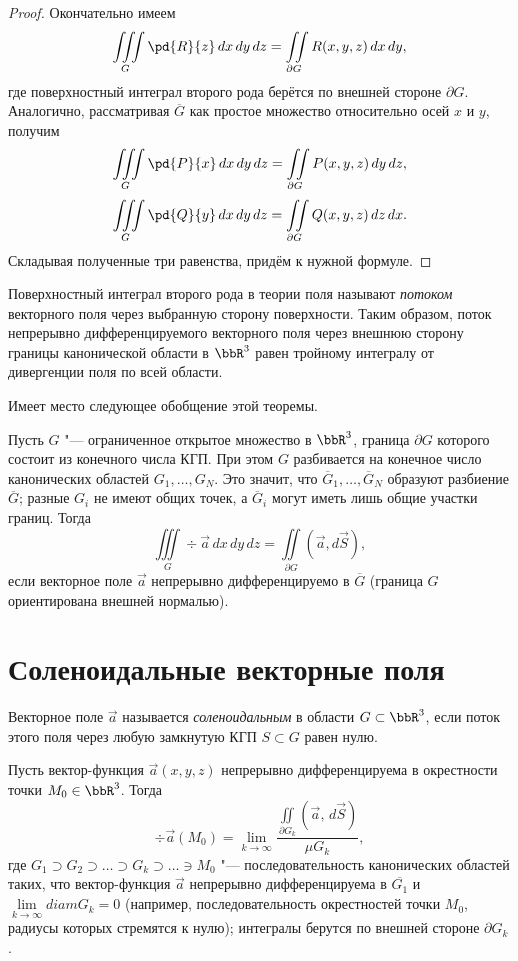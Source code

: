 \begin{proof}
Окончательно имеем
$$
\iiint\limits_G \pd{R}{z}\,dx\,dy\,dz = \iint\limits_{\partial G} R(x, y, z)\,dx\,dy,
$$
где поверхностный интеграл второго рода берётся по внешней стороне $\partial G$. Аналогично, рассматривая $\overline{G}$ как простое множество относительно осей $x$ и $y$, получим
$$
\iiint\limits_G \pd{P}{x}\,dx\,dy\,dz = \iint\limits_{\partial G} P(x, y, z)\,dy\,dz,
$$
$$
\iiint\limits_G \pd{Q}{y}\,dx\,dy\,dz = \iint\limits_{\partial G} Q(x, y, z)\,dz\,dx.
$$
Складывая полученные три равенства, придём к нужной формуле.
\end{proof}

Поверхностный интеграл второго рода в теории поля называют \textit{потоком} векторного поля через выбранную сторону поверхности. Таким образом, поток непрерывно дифференцируемого векторного поля через внешнюю сторону границы канонической области в $\bbR^3$ равен тройному интегралу от дивергенции поля по всей области.

Имеет место следующее обобщение этой теоремы.

\begin{thm}
Пусть $G$ "--- ограниченное открытое множество в $\bbR^3$, граница $\partial G$ которого состоит из конечного числа КГП. При этом $G$ разбивается на конечное число канонических областей $G_1, \ldots, G_N$. Это значит, что $\overline{G}_1, \ldots, \overline{G}_N$ образуют разбиение $\overline{G}$; разные $G_i$ не имеют общих точек, а $\overline{G}_i$ могут иметь лишь общие участки границ. Тогда
$$
\iiint\limits_G \div \vec{a}\,dx\,dy\,dz = \iint\limits_{\partial G} (\vec{a}, d\vec{S}),
$$
если векторное поле $\vec{a}$ непрерывно дифференцируемо в $\overline{G}$ (граница $G$ ориентирована внешней нормалью).
\end{thm}


\section{Соленоидальные векторные поля}

\begin{defn}
Векторное поле $\vec{a}$ называется \textit{соленоидальным} в области $G \subset \bbR^3$, если поток этого поля через любую замкнутую КГП $S \subset G$ равен нулю.
\end{defn}

\begin{thm} \label{th21:2}
Пусть вектор-функция $\vec{a}(x, y, z)$ непрерывно дифференцируема в окрестности точки $M_0 \in \bbR^3$. Тогда
$$
\div \vec{a}(M_0) = \lim_{k \to \infty} \frac{\iint\limits_{\partial G_k} (\vec{a},\, d\vec{S})}{\mu G_k},
$$
где $G_1 \supset G_2 \supset \ldots \supset G_k \supset \ldots \ni M_0$ "--- последовательность канонических областей таких, что вектор-функция $\vec{a}$ непрерывно дифференцируема в $\overline{G_1}$ и $\lim\limits_{k \to \infty} diam G_k = 0$ (например, последовательность окрестностей точки $M_0$, радиусы которых стремятся к нулю); интегралы берутся по внешней стороне $\partial G_k$.
\end{thm}

